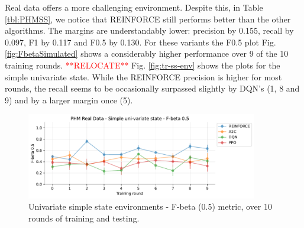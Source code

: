 \documentclass[a4paper, 12pt]{article}
\begin{document}
Real data offers a more challenging environment. Despite this, in Table \ref{tbl:PHMSS}, we notice that REINFORCE still performs better than the other algorithms. The margins are understandably lower: precision by 0.155, recall by 0.097, F1 by 0.117 and F0.5 by 0.130. For these variants the F0.5 plot Fig. \ref{fig:FbetaSimulated} shows a considerably higher performance over 9 of the 10 training rounds. \textcolor{red}{**RELOCATE**} Fig. \ref{fig:tr-ss-env} shows the plots for the simple univariate state. While the REINFORCE precision is higher for most rounds, the recall seems to be occasionally surpassed slightly by DQN's (1, 8 and 9) and by a larger margin once (5).
\begin{figure}[h]
	\centering
	\includegraphics[width=0.9\textwidth]{Singevariable_F05.pdf}  
	\caption{Univariate simple state environments - F-beta (0.5) metric, over 10 rounds of training and testing.}
	\label{fig:FbetaPHMSS}
\end{figure}
\end{document}
